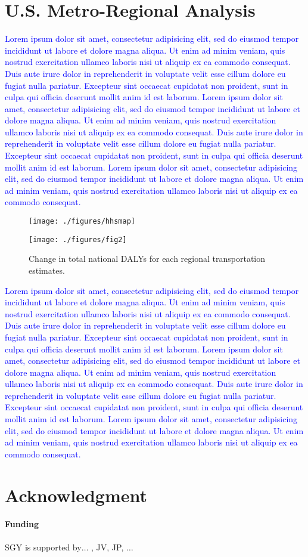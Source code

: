 \documentclass{bioinfo}
\newcommand{\col}[2][red]{\textcolor{#1}{#2}}
\begin{document}
\section{U.S. Metro-Regional Analysis}
\col[blue]{Lorem ipsum dolor sit amet, consectetur adipisicing elit, sed do
eiusmod tempor incididunt ut labore et dolore magna aliqua. Ut enim ad
minim veniam, quis nostrud exercitation ullamco laboris nisi ut
aliquip ex ea commodo consequat. Duis aute irure dolor in
reprehenderit in voluptate velit esse cillum dolore eu fugiat nulla
pariatur. Excepteur sint occaecat cupidatat non proident, sunt in
culpa qui officia deserunt mollit anim id est laborum. Lorem ipsum
dolor sit amet, consectetur adipisicing elit, sed do eiusmod tempor
incididunt ut labore et dolore magna aliqua. Ut enim ad minim veniam,
quis nostrud exercitation ullamco laboris nisi ut aliquip ex ea
commodo consequat. Duis aute irure dolor in reprehenderit in voluptate
velit esse cillum dolore eu fugiat nulla pariatur. Excepteur sint
occaecat cupidatat non proident, sunt in culpa qui officia deserunt
mollit anim id est laborum. Lorem ipsum dolor sit amet, consectetur
adipisicing elit, sed do eiusmod tempor incididunt ut labore et dolore
magna aliqua. Ut enim ad minim veniam, quis nostrud exercitation
ullamco laboris nisi ut aliquip ex ea commodo consequat.}


\begin{figure}[t]
    \centerline{\texttt{[image: ./figures/hhsmap]}}
    \centerline{\texttt{[image: ./figures/fig2]}}
    \caption{Change in total national DALYs for each regional
      transportation estimates.}\label{dalyFigure}
\end{figure}

\col[blue]{Lorem ipsum dolor sit amet, consectetur adipisicing elit, sed do
eiusmod tempor incididunt ut labore et dolore magna aliqua. Ut enim ad
minim veniam, quis nostrud exercitation ullamco laboris nisi ut
aliquip ex ea commodo consequat. Duis aute irure dolor in
reprehenderit in voluptate velit esse cillum dolore eu fugiat nulla
pariatur. Excepteur sint occaecat cupidatat non proident, sunt in
culpa qui officia deserunt mollit anim id est laborum. Lorem ipsum
dolor sit amet, consectetur adipisicing elit, sed do eiusmod tempor
incididunt ut labore et dolore magna aliqua. Ut enim ad minim veniam,
quis nostrud exercitation ullamco laboris nisi ut aliquip ex ea
commodo consequat. Duis aute irure dolor in reprehenderit in voluptate
velit esse cillum dolore eu fugiat nulla pariatur. Excepteur sint
occaecat cupidatat non proident, sunt in culpa qui officia deserunt
mollit anim id est laborum. Lorem ipsum dolor sit amet, consectetur
adipisicing elit, sed do eiusmod tempor incididunt ut labore et dolore
magna aliqua. Ut enim ad minim veniam, quis nostrud exercitation
ullamco laboris nisi ut aliquip ex ea commodo consequat.}

\section*{Acknowledgment}
\paragraph{Funding\textcolon} SGY is supported by$\ldots$ , JV, JP, $\ldots$

%
%


\end{document}
